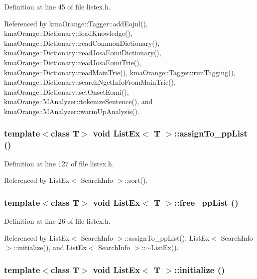 Definition at line 45 of file listex.h.

Referenced by kmaOrange::Tagger::addEojul(), kmaOrange::Dictionary::loadKnowledge(), kmaOrange::Dictionary::readCommonDictionary(), kmaOrange::Dictionary::readJosaEomiDictionary(), kmaOrange::Dictionary::readJosaEomiTrie(), kmaOrange::Dictionary::readMainTrie(), kmaOrange::Tagger::runTagging(), kmaOrange::Dictionary::searchNgetInfoFromMainTrie(), kmaOrange::Dictionary::setOnsetEomi(), kmaOrange::MAnalyzer::tokenizeSentence(), and kmaOrange::MAnalyzer::warmUpAnalysis().\hypertarget{classListEx_b93fee1e8bf433bc66b6522227babdc5}{
\subsubsection[{assignTo\_\-ppList}]{\setlength{\rightskip}{0pt plus 5cm}template$<$class T$>$ void {\bf ListEx}$<$ T $>$::assignTo\_\-ppList ()}}
\label{classListEx_b93fee1e8bf433bc66b6522227babdc5}




Definition at line 127 of file listex.h.

Referenced by ListEx$<$ SearchInfo $>$::sort().\hypertarget{classListEx_33891b15cb9a612d4e49434889441160}{
\subsubsection[{free\_\-ppList}]{\setlength{\rightskip}{0pt plus 5cm}template$<$class T$>$ void {\bf ListEx}$<$ T $>$::free\_\-ppList ()}}
\label{classListEx_33891b15cb9a612d4e49434889441160}




Definition at line 26 of file listex.h.

Referenced by ListEx$<$ SearchInfo $>$::assignTo\_\-ppList(), ListEx$<$ SearchInfo $>$::initialize(), and ListEx$<$ SearchInfo $>$::$\sim$ListEx().\hypertarget{classListEx_261a36557da2280b02fcb79eea3525fd}{
\subsubsection[{initialize}]{\setlength{\rightskip}{0pt plus 5cm}template$<$class T$>$ void {\bf ListEx}$<$ T $>$::initialize ()}}
\label{classListEx_261a36557da2280b02fcb79eea3525fd}




